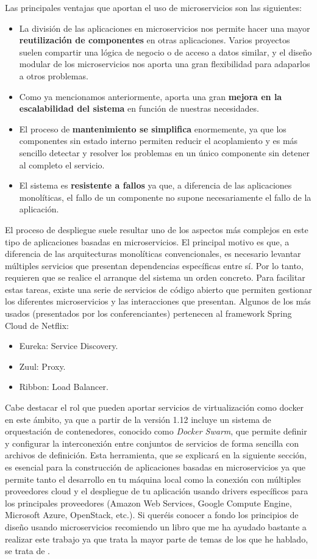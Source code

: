 Las principales ventajas que aportan el uso de microservicios son las siguientes:
\begin{itemize}
\item La división de las aplicaciones en microservicios nos permite hacer una mayor \textbf{reutilización de componentes} en otras aplicaciones. Varios proyectos suelen compartir una lógica de negocio o de acceso a datos similar, y el diseño modular de los microservicios nos aporta una gran flexibilidad para adaparlos a otros problemas.
\item Como ya mencionamos anteriormente, aporta una gran \textbf{mejora en la escalabilidad del sistema} en función de nuestras necesidades.
\item El proceso de \textbf{mantenimiento se simplifica} enormemente, ya que los componentes sin estado interno permiten reducir el acoplamiento y es más sencillo detectar y resolver los problemas en un único componente sin detener al completo el servicio.
\item El sistema es \textbf{resistente a fallos} ya que, a diferencia de las aplicaciones monolíticas, el fallo de un componente no supone necesariamente el fallo de la aplicación.
\end{itemize}

El proceso de despliegue suele resultar uno de los aspectos más complejos en este tipo de aplicaciones basadas en microservicios. El principal motivo es que, a diferencia de las arquitecturas monolíticas convencionales, es necesario levantar múltiples servicios que presentan dependencias específicas entre sí. Por lo tanto, requieren que se realice el arranque del sistema un orden concreto. Para facilitar estas tareas, existe una serie de servicios de código abierto que permiten gestionar los diferentes microservicios y las interacciones que presentan. Algunos de los más usados (presentados por los conferenciantes) pertenecen al framework Spring Cloud de Netflix:
\begin{itemize}
\item Eureka: Service Discovery.
\item Zuul: Proxy.
\item Ribbon: Load Balancer.
\end{itemize}

Cabe destacar el rol que pueden aportar servicios de virtualización como docker en este ámbito, ya que a partir de la versión 1.12 incluye un sistema de orquestación de contenedores, conocido como \emph{Docker Swarm}, que permite definir y configurar la interconexión entre conjuntos de servicios de forma sencilla con archivos de definición. Esta herramienta, que se explicará en la siguiente sección, es esencial para la construcción de aplicaciones basadas en microservicios ya que permite tanto el desarrollo en tu máquina local como la conexión con múltiples proveedores cloud y el despliegue de tu aplicación usando drivers específicos para los principales proveedores (Amazon Web Services, Google Compute Engine, Microsoft Azure, OpenStack, etc.). Si queréis conocer a fondo los principios de diseño usando microservicios recomiendo un libro que me ha ayudado bastante a realizar este trabajo ya que trata la mayor parte de temas de los que he hablado, se trata de \cite{microbook}.


